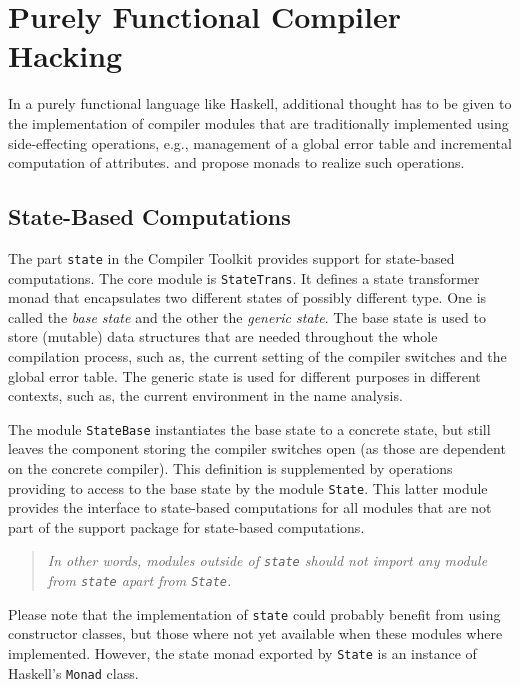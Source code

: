 \documentclass{report}
\newcommand{\code}[1]{\texttt{#1}}
\begin{document}
\chapter{Purely Functional Compiler Hacking}
\label{cha:func-comp}

In a purely functional language like Haskell, additional thought has to be
given to the implementation of compiler modules that are traditionally
implemented using side-effecting operations, e.g., management of a global
error table and incremental computation of attributes.
 and
 propose monads to realize such 
operations.


\section{State-Based Computations}
\label{sec:state}

The part \code{state} in the Compiler Toolkit provides support for state-based
computations.  The core module is \code{StateTrans}. It defines a state
transformer monad that encapsulates two different states of possibly different
type. One is called the \emph{base state} and the other the \emph{generic
  state}. The base state is used to store (mutable) data structures that are
needed throughout the whole compilation process, such as, the current setting
of the compiler switches and the global error table. The generic state is used
for different purposes in different contexts, such as, the current environment
in the name analysis.

The module \code{StateBase} instantiates the base state to a concrete state,
but still leaves the component storing the compiler switches open (as those
are dependent on the concrete compiler).  This definition is supplemented by
operations providing to access to the base state by the module \code{State}.
This latter module provides the interface to state-based computations for all
modules that are not part of the support package for state-based computations.

\begin{quote}\itshape
  In other words, modules outside of \code{state} should not import any module
  from \code{state} apart from \code{State}.
\end{quote}

Please note that the implementation of \code{state} could probably benefit
from using constructor classes, but those where not yet available when these
modules where implemented.  However, the state monad exported by \code{State}
is an instance of Haskell's \code{Monad} class.
\end{document}

